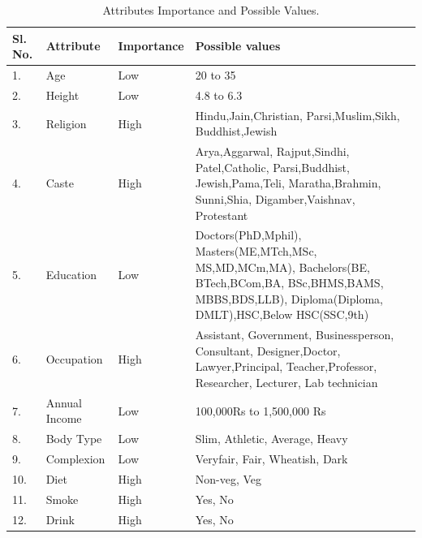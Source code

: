 \documentclass[12pt,oneside]{book}
\begin{document}
\begin{table}[h!]
\centering
\caption{Attributes Importance and Possible Values.}
\vspace{0.1in}
\begin{tabular}{|m{1cm}|m{2cm}|m{2cm}|m{8.3em}|}
\hline
Sl. No. & Attribute & Importance & Possible values \\
\hline
1. & Age & Low & 20 to 35 \\
\hline
2. & Height & Low & 4.8 to 6.3 \\
\hline
3. & Religion & High & Hindu,Jain,Christian,
                      Parsi,Muslim,Sikh, 
                        Buddhist,Jewish \\
\hline
4. & Caste & High & Arya,Aggarwal,
                    Rajput,Sindhi,
                    Patel,Catholic,
                    Parsi,Buddhist,
                    Jewish,Pama,Teli,
                    Maratha,Brahmin,
                    Sunni,Shia,
                    Digamber,Vaishnav,
                    Protestant \\
\hline
5. & Education & Low & Doctors(PhD,Mphil),
                       Masters(ME,MTch,MSc,
                       MS,MD,MCm,MA),
                       Bachelors(BE,
                       BTech,BCom,BA,
                       BSc,BHMS,BAMS,
                       MBBS,BDS,LLB), 
                       Diploma(Diploma,
                       DMLT),HSC,Below
                       HSC(SSC,9th)
                        \\
\hline
6. & Occupation & High & Assistant,
                         Government,
                         Businessperson,
                         Consultant,
                         Designer,Doctor,
                         Lawyer,Principal,
                         Teacher,Professor,
                         Researcher,
                         Lecturer,
                         Lab technician  \\
\hline
7. & Annual Income & Low & 100,000Rs to 1,500,000 Rs  \\
\hline
8. & Body Type & Low& Slim, Athletic,
                      Average, Heavy \\
\hline
9. & Complexion & Low & Veryfair, Fair,
                        Wheatish, Dark \\
\hline
10. & Diet & High & Non-veg, Veg \\
\hline
11. & Smoke & High & Yes, No \\
\hline
12. & Drink & High & Yes, No \\
\hline
\end{tabular}
\end{table}
\end{document}
